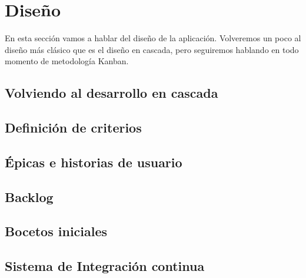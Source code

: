 \section{Diseño}
\setlength{\parskip}{0.5cm}

En esta sección vamos a hablar del diseño de la aplicación. Volveremos un poco al diseño más clásico que es el diseño en cascada, pero seguiremos hablando en todo momento de metodología Kanban. 

\subsection{Volviendo al desarrollo en cascada}


\subsection{Definición de criterios}


\subsection{Épicas e historias de usuario}


\subsection{Backlog}


\subsection{Bocetos iniciales}


\subsection{Sistema de Integración continua}
